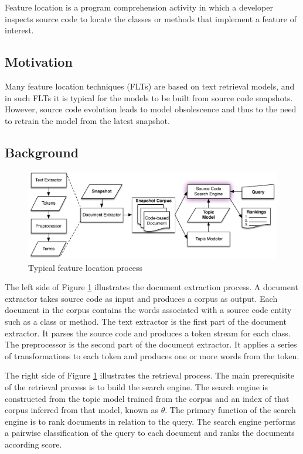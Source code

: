 \documentclass[12pt,draft]{Manuscript}
\begin{document}
\begin{body}
Feature location is a program comprehension activity in which a
developer inspects source code to locate the classes or methods that
implement a feature of interest.

\subsection{Motivation}\label{motivation-1}

Many feature location techniques (FLTs) are based on text retrieval
models, and in such FLTs it is typical for the models to be built from
source code snapshots. However, source code evolution leads to model
obsolescence and thus to the need to retrain the model from the latest
snapshot.

\subsection{Background}\label{flt-background}

\begin{figure}[htbp]
\centering
\includegraphics{figures/snapshot-flt.pdf}
\caption{Typical feature location process\label{fig:snapshot-flt}}
\end{figure}

The left side of Figure \ref{fig:snapshot-flt} illustrates the document
extraction process. A document extractor takes source code as input and
produces a corpus as output. Each document in the corpus contains the
words associated with a source code entity such as a class or method.
The text extractor is the first part of the document extractor. It
parses the source code and produces a token stream for each class. The
preprocessor is the second part of the document extractor. It applies a
series of transformations to each token and produces one or more words
from the token.

The right side of Figure \ref{fig:snapshot-flt} illustrates the
retrieval process. The main prerequisite of the retrieval process is to
build the search engine. The search engine is constructed from the topic
model trained from the corpus and an index of that corpus inferred from
that model, known as \(\theta\). The primary function of the search
engine is to rank documents in relation to the query. The search engine
performs a pairwise classification of the query to each document and
ranks the documents according score.


\end{body}
\end{document}
